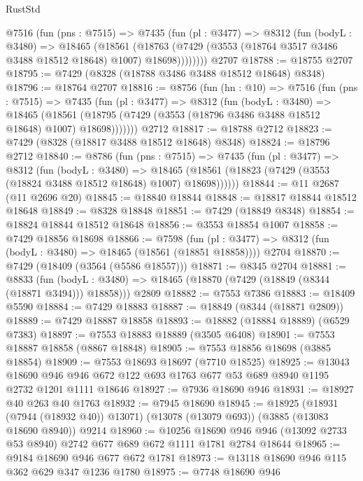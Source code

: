 \begin{lexlean}{RustStd}
\begin{coremodule}
      @7516
        (fun (pns : @7515) =>
        @7435
          (fun (pl : @3477) =>
          @8312
            (fun (bodyL : @3480) =>
            @18465
              (@18561
                (@18763 (@7429 (@3553 (@18764 @3517 @3486 @3488 @18512 @18648) @1007) @18698))))))))
    @2707
@18788 := @18755 @2707
@18795 := @7429 (@8328 (@18788 @3486 @3488 @18512 @18648) @8348)
@18796 := @18764 @2707
@18816 := @8756
    (fun (hn : @10) =>
    @7516
      (fun (pns : @7515) =>
      @7435
        (fun (pl : @3477) =>
        @8312
          (fun (bodyL : @3480) =>
          @18465
            (@18561 (@18795 (@7429 (@3553 (@18796 @3486 @3488 @18512 @18648) @1007) @18698)))))))
    @2712
@18817 := @18788 @2712
@18823 := @7429 (@8328 (@18817 @3488 @18512 @18648) @8348)
@18824 := @18796 @2712
@18840 := @8786
    (fun (pns : @7515) =>
    @7435
      (fun (pl : @3477) =>
      @8312
        (fun (bodyL : @3480) =>
        @18465 (@18561 (@18823 (@7429 (@3553 (@18824 @3488 @18512 @18648) @1007) @18698))))))
@18844 := @11 @2687 (@11 @2696 @20)
@18845 := @18840 @18844
@18848 := @18817 @18844 @18512 @18648
@18849 := @8328 @18848
@18851 := @7429 (@18849 @8348)
@18854 := @18824 @18844 @18512 @18648
@18856 := @3553 @18854 @1007
@18858 := @7429 @18856 @18698
@18866 := @7598
    (fun (pl : @3477) => @8312 (fun (bodyL : @3480) => @18465 (@18561 (@18851 @18858))))
    @2704
@18870 := @7429 (@18409 (@3564 (@5586 @18557)))
@18871 := @8345 @2704
@18881 := @8833
    (fun (bodyL : @3480) => @18465 (@18870 (@7429 (@18849 (@8344 (@18871 @3494))) @18858)))
    @2809
@18882 := @7553 @7386
@18883 := @18409 @5590
@18884 := @7429 @18883
@18887 := @18849 (@8344 (@18871 @2809))
@18889 := @7429 @18887 @18858
@18893 := @18882 (@18884 @18889) (@6529 @7383)
@18897 := @7553 @18883 @18889 (@3505 @6408)
@18901 := @7553 @18887 @18858 (@8867 @18848)
@18905 := @7553 @18856 @18698 (@3885 @18854)
@18909 := @7553 @18693 @18697 (@7710 @18525)
@18925 := @13043
    @18690
    @946
    @946
    @672
    @122
    @693
    @1763
    @677
    @53
    @689
    @8940
    @1195
    @2732
    @1201
    @1111
    @18646
@18927 := @7936 @18690 @946
@18931 := @18927 @40 @263 @40 @1763
@18932 := @7945 @18690
@18945 := @18925
    (@18931 (@7944 (@18932 @40)) @13071)
    (@13078 (@13079 @693))
    (@3885 (@13083 @18690 @8940))
    @9214
@18960 := @10256
    @18690
    @946
    @946
    (@13092 @2733 @53 @8940)
    @2742
    @677
    @689
    @672
    @1111
    @1781
    @2784
    @18644
@18965 := @9184 @18690 @946 @677 @672 @1781
@18973 := @13118 @18690 @946 @115 @362 @629 @347 @1236 @1780
@18975 := @7748 @18690 @946

\end{coremodule}
\end{lexlean}
